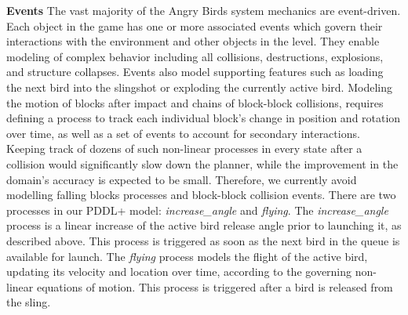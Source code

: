 \documentclass[letterpaper]{article}
\begin{document}
\noindent\textbf{Events}
The vast majority of the Angry Birds system mechanics are event-driven.
\vspace{-3.44mm}
Each object in the game has one or more associated events which govern their interactions with the environment and other objects in the level.
They enable modeling of complex behavior including all collisions, destructions, explosions, and structure collapses. Events also model supporting features such as loading the next bird into the slingshot or exploding the currently active bird.
Modeling the motion of blocks after impact and chains of block-block collisions, requires defining a process to track each individual block's change in position and rotation over time, as well as a set of events to account for secondary interactions.
Keeping track of dozens of such non-linear processes in every state after a collision would significantly slow down the planner, while the improvement in the domain's accuracy is expected to be small.
Therefore, we currently avoid modelling falling blocks processes and block-block collision events. %
There are two processes in our PDDL+ model: \textit{increase\_angle} and \textit{flying}.  The \textit{increase\_angle} process is a linear increase of the active bird release angle prior to launching it, as described above. This process is triggered as soon as the next bird in the queue is available for launch. %
The \textit{flying} process models the flight of the active bird, updating its velocity and location over time, according to the governing non-linear equations of motion. This process is triggered after a bird is released from the sling. %
\end{document}
